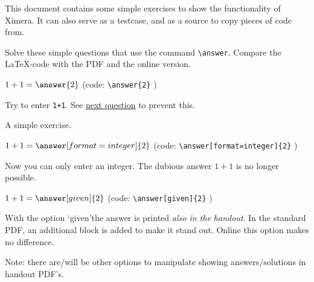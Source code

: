 \documentclass{ximera}
\begin{document}
    \author{Wim Obbels}
    \label{xim:simple_exercies}

This document contains some simple exercises to show the functionality of Ximera. It can also serve as a testcase, and as a source to copy pieces of code from.


\begin{exercise}    
    Solve these simple questions that use the command \verb|\answer|. Compare the \LaTeX-code with the PDF and the online version.
	\begin{question}\label{itm:showCase:eerste_oefening}
        $1+1 = \answer{2}$ \hspace{2cm} (code:  \verb|\answer{2}| )

        \begin{hint} 
            Try to enter \verb|1+1|. See \hyperref[exc:answer_integer]{next question} to prevent this.
        \end{hint} 
        \begin{oplossing}
            A simple exercise. %
        \end{oplossing}
    \end{question}

    \begin{question}\label{exc:answer_integerà}\label{itm:showCase:eerste_oefening}
        $1+1 = \answer[format=integer]{2}$ \hspace{2cm} (code:  \verb|\answer[format=integer]{2}| )
        \begin{oplossing}
            Now you can only enter an integer. The dubious answer $1+1$ is no longer possible.
        \end{oplossing}
    \end{question}

    \begin{question}
        $1+1 = \answer[given]{2}$ \hspace{2cm} (code:  \verb|\answer[given]{2}| )

        \begin{oplossing}
           With the option \lq given\rq the answer is printed  \textit{also in the handout}. 
            In the standard PDF, an additional block is added to make it stand out.
            Online this option makes no difference.

            Note: there are/will be other options to manipulate showing answers/solutions in handout PDF's.
        \end{oplossing}
    \end{question}


\end{exercise}
\end{document}
